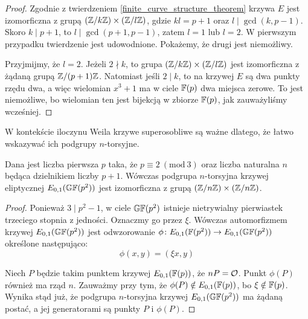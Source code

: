 \begin{proof}
Zgodnie z twierdzeniem \ref{finite_curve_structure_theorem}
krzywa $E$ jest izomorficzna z grupą $(\mathbb{Z} / k\mathbb{Z}) \times (\mathbb{Z} / l\mathbb{Z})$,
gdzie $kl = p+1$ oraz $l \mid \gcd(k, p-1)$.
Skoro $k \mid p+1$, to $l \mid \gcd(p+1, p-1)$,
zatem $l = 1$ lub $l = 2$.
W pierwszym przypadku twierdzenie jest udowodnione.
Pokażemy, że drugi jest niemożliwy.

\noindent
Przyjmijmy, że $l = 2$.
Jeżeli $2 \nmid k$,
to grupa $(\mathbb{Z} / k\mathbb{Z}) \times (\mathbb{Z} / l\mathbb{Z})$ jest izomorficzna
z żądaną grupą $\mathbb{Z} / (p+1)\mathbb{Z}$.
Natomiast jeśli $2 \mid k$, to na krzywej $E$ są dwa punkty rzędu dwa,
a więc wielomian $x^3 + 1$ ma w ciele $\mathbb{F}(p)$ dwa miejsca zerowe.
To jest niemożliwe, bo wielomian ten jest bijekcją w zbiorze $\mathbb{F}(p)$,
jak zauważyliśmy wcześniej.
\end{proof}

\noindent
W kontekście iloczynu Weila krzywe superosobliwe są ważne dlatego,
że łatwo wskazywać ich podgrupy $n$-torsyjne.

\begin{theorem}
Dana jest liczba pierwsza $p$ taka, że $p \equiv 2\ (\mathrm{mod}\ 3)$
oraz liczba naturalna $n$ będąca dzielnikiem liczby $p + 1$.
Wówczas podgrupa $n$-torsyjna krzywej eliptycznej $E_{0,1}(\mathbb{GF}(p^2))$
jest izomorficzna z grupą $(\mathbb{Z} / n\mathbb{Z}) \times (\mathbb{Z} / n\mathbb{Z})$.
\end{theorem}

\begin{proof}
Ponieważ $3 \mid p^2-1$, w ciele $\mathbb{GF}(p^2)$
istnieje nietrywialny pierwiastek trzeciego stopnia z jedności.
Oznaczmy go przez $\xi$.
Wówczas automorfizmem krzywej $E_{0,1}(\mathbb{GF}(p^2))$ jest
odwzorowanie $\phi\colon E_{0,1}(\mathbb{F}(p^2)) \to E_{0,1}(\mathbb{GF}(p^2))$
określone następująco:
\begin{equation}\label{supersingular_curve_automorphism_eqn}
\phi(x, y) = (\xi x, y)
\end{equation}

\noindent
Niech $P$ będzie takim punktem krzywej $E_{0,1}(\mathbb{F}(p))$, że $nP = \mathcal{O}$.
Punkt $\phi(P)$ również ma rząd $n$.
Zauważmy przy tym, że $\phi(P) \notin E_{0,1}(\mathbb{F}(p))$,
bo $\xi \notin \mathbb{F}(p)$.
Wynika stąd już, że podgrupa $n$-torsyjna krzywej $E_{0,1}(\mathbb{GF}(p^2))$
ma żądaną postać, a jej generatorami są punkty $P$ i $\phi(P)$.
\end{proof}
